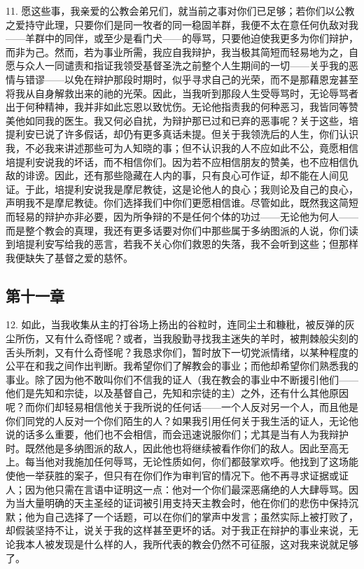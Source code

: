 11. 愿这些事，我亲爱的公教会弟兄们，就当前之事对你们已足够；若你们以公教之爱持守此理，只要你们是同一牧者的同一稳固羊群，我便不太在意任何仇敌对我——羊群中的同伴，或至少是看门犬——的辱骂，只要他迫使我更多为你们辩护，而非为己。然而，若为事业所需，我应自我辩护，我当极其简短而轻易地为之，自愿与众人一同谴责和指证我领受基督圣洗之前整个人生期间的一切——关乎我的恶情与错谬——以免在辩护那段时期时，似乎寻求自己的光荣，而不是那藉恩宠甚至将我从自身解救出来的祂的光荣。因此，当我听到那段人生受辱骂时，无论辱骂者出于何种精神，我并非如此忘恩以致忧伤。无论他指责我的何种恶习，我皆同等赞美他如同我的医生。我又何必自扰，为辩护那已过和已弃的恶事呢？关于这些，培提利安已说了许多假话，却仍有更多真话未提。但关于我领洗后的人生，你们认识我，不必我来讲述那些可为人知晓的事；但不认识我的人不应如此不公，竟愿相信培提利安说我的坏话，而不相信你们。因为若不应相信朋友的赞美，也不应相信仇敌的诽谤。因此，还有那些隐藏在人内的事，只有良心可作证，却不能在人间见证。于此，培提利安说我是摩尼教徒，这是论他人的良心；我则论及自己的良心，声明我不是摩尼教徒。你们选择我们中你们更愿相信谁。尽管如此，既然我这简短而轻易的辩护亦非必要，因为所争辩的不是任何个体的功过——无论他为何人——而是整个教会的真理，我还有更多话要对你们中那些属于多纳图派的人说，你们读到培提利安写给我的恶言，若我不关心你们救恩的失落，我不会听到这些；但那样我便缺失了基督之爱的慈怀。\par


\subsection{第十一章}

12. 如此，当我收集从主的打谷场上扬出的谷粒时，连同尘土和糠秕，被反弹的灰尘所伤，又有什么奇怪呢？或者，当我殷勤寻找我主迷失的羊时，被荆棘般尖刻的舌头所刺，又有什么奇怪呢？我恳求你们，暂时放下一切党派情绪，以某种程度的公平在和我之间作出判断。我希望你们了解教会的事业；而他却希望你们熟悉我的事业。除了因为他不敢叫你们不信我的证人（我在教会的事业中不断援引他们——他们是先知和宗徒，以及基督自己，先知和宗徒的主）之外，还有什么其他原因呢？而你们却轻易相信他关于我所说的任何话——一个人反对另一个人，而且他是你们同党的人反对一个你们陌生的人？如果我引用任何关于我生活的证人，无论他说的话多么重要，他们也不会相信，而会迅速说服你们；尤其是当有人为我辩护时。既然他是多纳图派的敌人，因此他也将继续被看作你们的敌人。因此至高无上。每当他对我施加任何辱骂，无论性质如何，你们都鼓掌欢呼。他找到了这场能使他一举获胜的案子，但只有在你们作为审判官的情况下。他不再寻求证据或证人；因为他只需在言语中证明这一点：他对一个你们最深恶痛绝的人大肆辱骂。因为当大量明确的天主圣经的证词被引用支持天主教会时，他在你们的悲伤中保持沉默；他为自己选择了一个话题，可以在你们的掌声中发言；虽然实际上被打败了，却假装坚持不让，说关于我的这样甚至更坏的话。对于我正在辩护的事业来说，无论我本人被发现是什么样的人，我所代表的教会仍然不可征服，这对我来说就足够了。\par

